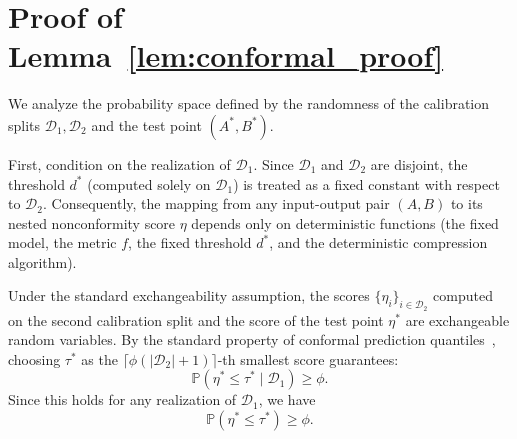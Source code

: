 \section{Proof of Lemma~\ref{lem:conformal_proof}}
\label{app:conformal_proof}

We analyze the probability space defined by the randomness of the calibration splits $\mathcal{D}_1, \mathcal{D}_2$ and the test point $(A^*, B^*)$.

First, condition on the realization of $\mathcal{D}_1$. Since $\mathcal{D}_1$ and $\mathcal{D}_2$ are disjoint, the threshold $d^*$ (computed solely on $\mathcal{D}_1$) is treated as a fixed constant with respect to $\mathcal{D}_2$. Consequently, the mapping from any input-output pair $(A, B)$ to its nested nonconformity score $\eta$ depends only on deterministic functions (the fixed model, the metric $f$, the fixed threshold $d^*$, and the deterministic compression algorithm).

Under the standard exchangeability assumption, the scores $\{\eta_i\}_{i \in \mathcal{D}_2}$ computed on the second calibration split and the score of the test point $\eta^*$ are exchangeable random variables. By the standard property of conformal prediction quantiles~\cite{vovk2005algorithmic}, choosing $\tau^*$ as the $\lceil \phi (|\mathcal{D}_2|+1) \rceil$-th smallest score guarantees:
\[ \mathbb{P}(\eta^* \le \tau^* \mid \mathcal{D}_1) \ge \phi. \]
Since this holds for any realization of $\mathcal{D}_1$, we have
\begin{equation}
    \label{eq:score_validity}
    \mathbb{P}(\eta^* \le \tau^*) \ge \phi.
\end{equation}

